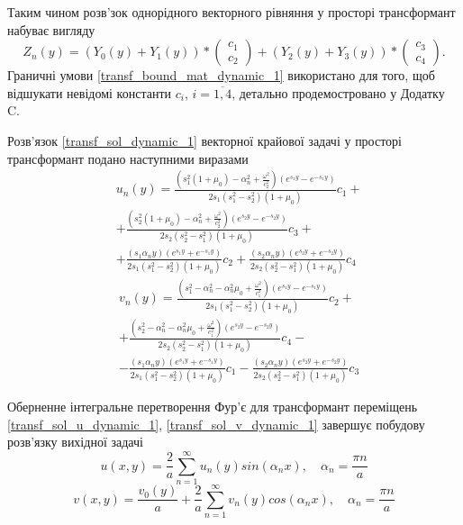 Таким чином розв'зок однорідного векторного рівняння у просторі трансформант набуває вигляду
\begin{equation}\label{transf_sol_dynamic_1}
    Z_n(y) =\left( Y_0(y) +  Y_1(y)  \right) * \begin{pmatrix} c_1 \\ c_2 \end{pmatrix} + \left( Y_2(y) +  Y_3(y) \right) * \begin{pmatrix} c_3 \\ c_4 \end{pmatrix}.
\end{equation}
Граничні умови \eqref{transf_bound_mat_dynamic_1} використано для того, щоб відшукати невідомі константи $c_i$, $i=\overline{1, 4}$,
детально продемостровано у Додатку C.

Розв'язок \eqref{transf_sol_dynamic_1} векторної крайової задачі у просторі трансформант подано наступними виразами
\begin{align}\label{transf_sol_u_dynamic_1}
    &u_n(y) = \frac{( s_1^2 (1 + \mu_0) -\alpha_n^2 + \frac{\omega^2}{c_2^2})(e^{s_1y} - e^{-s_1y})}{2s_1(s_1^2 - s_2^2)(1 + \mu_0)}c_1 + \nonumber \\
    & + \frac{( s_2^2 (1 + \mu_0) -\alpha_n^2 + \frac{\omega^2}{c_2^2})(e^{s_2y} - e^{-s_2y})}{2s_2(s_2^2 - s_1^2)(1 + \mu_0)}c_3 + \nonumber \\
    & + \frac{( s_1 \alpha_n y)(e^{s_1y} + e^{-s_1y})}{2s_1(s_1^2 - s_2^2)(1 + \mu_0)}c_2 + \frac{(s_2 \alpha_n y)(e^{s_2y} + e^{-s_2y})}{2s_2(s_2^2 - s_1^2)(1 + \mu_0)}c_4
\end{align}
\begin{align}\label{transf_sol_v_dynamic_1}
    &v_n(y) = \frac{(s_1^2 - \alpha_n^2 - \alpha_n^2\mu_0 + \frac{\omega^2}{c_1^2})(e^{s_1y} - e^{-s_1y})}{2s_1(s_1^2 - s_2^2)(1 + \mu_0)}c_2 + \nonumber \\
    & +\frac{(s_2^2 - \alpha_n^2 - \alpha_n^2\mu_0 + \frac{\omega^2}{c_1^2})(e^{s_2y} - e^{-s_2y})}{2s_2(s_2^2 - s_1^2)(1 + \mu_0)}c_4 - \nonumber \\
    & - \frac{(s_1 \alpha_n y)(e^{s_1y} + e^{-s_1y})}{2s_1(s_1^2 - s_2^2)(1 + \mu_0)}c_1 - \frac{(s_2 \alpha_n y)(e^{s_2y} + e^{-s_2y})}{2s_2(s_2^2 - s_1^2)(1 + \mu_0)}c_3
\end{align}

Оберненне інтегральне перетворення Фур'є для трансформант переміщень \eqref{transf_sol_u_dynamic_1}, \eqref{transf_sol_v_dynamic_1}
завершує побудову розв'язку вихідної задачі
\begin{equation}\label{final_sol_u_dynamic_1}
    u(x,y) = \frac{2}{a} \sum_{n=1}^{\infty} u_n(y) sin(\alpha_n x), \quad \alpha_n = \frac{\pi n}{a}
\end{equation}
\begin{equation}\label{final_sol_v_dynamic_1}
    v(x,y) = \frac{v_0(y)}{a} + \frac{2}{a} \sum_{n=1}^{\infty} v_n(y) cos(\alpha_n x), \quad \alpha_n = \frac{\pi n}{a}
\end{equation}


